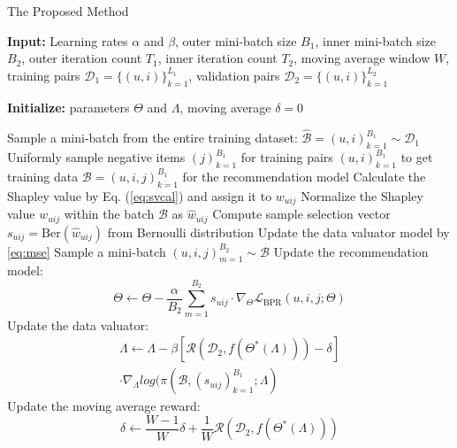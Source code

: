\begin{algorithm}[H]
    \caption{The Proposed Method}
    \label{al:method}
    
    \textbf{Input:} Learning rates $\alpha$ and $\beta$, outer mini-batch size $B_1$, inner mini-batch size $B_2$, outer iteration count $T_1$, inner iteration count $T_2$, moving average window $W$, training pairs $\mathcal{D}_{1}=\{(u,i)\}_{k=1}^{L_1}$, validation pairs $\mathcal{D}_{2}=\{(u,i)\}_{k=1}^{L_2}$
    
    \textbf{Initialize:} parameters $\Theta$ and $\Lambda$, moving average $\delta=0$
    
    \begin{algorithmic}[1]
        \STATE Sample a mini-batch from the entire training dataset: $\mathcal{\hat{B}}=(u,i)_{k=1}^{B_1}\sim \mathcal{D}_1$
        \STATE Uniformly sample negative items $(j)_{k=1}^{B_1}$ for training pairs $(u,i)_{k=1}^{B_1}$ to get training data $\mathcal{B}=(u,i,j)_{k=1}^{B_1}$ for the recommendation model
        \STATE Calculate the Shapley value by Eq. (\ref{eq:svcal}) and assign it to $w_{uij}$
        \ENDFOR
        \STATE Normalize the Shapley value $w_{uij}$ within the batch $\mathcal{B}$ as $\hat{w}_{uij}$ 
        \STATE Compute sample selection vector $s_{uij}=\text{Ber}(\hat{w}_{uij})$ from Bernoulli distribution
        \STATE Update the data valuator model by \ref{eq:mse}
        \STATE Sample a mini-batch $(u,i,j)_{m=1}^{B_2}\sim \mathcal{B}$
        \STATE Update the recommendation model:
    $$\Theta \leftarrow \Theta-\frac{\alpha}{B_2} \sum_{m=1}^{B_2} s_{uij} \cdot \nabla_\Theta \mathcal{L}_{\text{BPR}}(u,i,j;\Theta)$$
        \ENDFOR
    \STATE Update the data valuator:
    $$ \begin{array}{r}
    \Lambda \longleftarrow \Lambda - \beta [\mathcal{R}(\mathcal{D}_2, f(\Theta^*(\Lambda)))-\delta ]\\ \cdot \nabla_{\Lambda}log(\pi(\mathcal{B},(s_{uij})_{k=1}^{B_1};{\Lambda})
    \end{array}
    $$
    \STATE Update the moving average reward:
    $$
    \delta \leftarrow \frac{W-1}{W} \delta+\frac{1}{W} \mathcal{R}(\mathcal{D}_2, f(\Theta^*(\Lambda)))
    $$                               
    \ENDFOR
    \end{algorithmic}
\end{algorithm}





